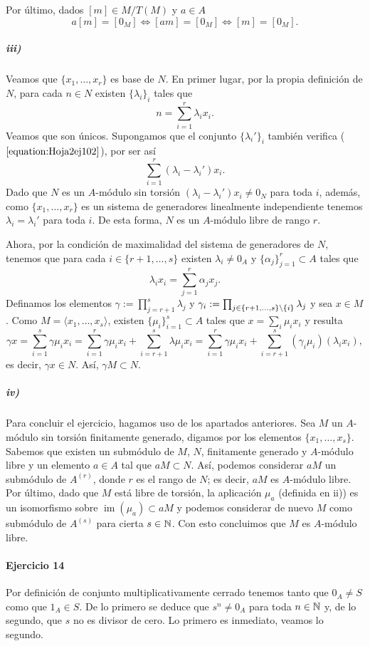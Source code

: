 \documentclass[../main.tex]{subfiles}
\begin{document}
Por último, dados $[m]\in M/T(M)$ y $a\in A$
$$a[m]=[0_M]\Longleftrightarrow [am]=[0_M]\Longleftrightarrow [m]=[0_M].$$

\subparagraph{iii)} Veamos que $\{x_1,\dots,x_r\}$ es base de $N$. En primer lugar, por la propia definición de $N$, para cada $n\in N$ existen $\{\lambda_i\}_i$ tales que
\begin{equation}\label{equation:Hoja2ej102}
    n=\sum_{i=1}^r\lambda_ix_i.
\end{equation}
Veamos que son únicos. Supongamos que el conjunto $\{\lambda_i'\}_i$ también verifica ($\ref{equation:Hoja2ej102}$), por ser así
$$\sum_{i=1}^r(\lambda_i-\lambda_i')x_i.$$
Dado que $N$ es un $A$-módulo sin torsión $(\lambda_i-\lambda_i')x_i\neq 0_N$ para toda $i$, además, como $\{x_1,\dots,x_r\}$ es un sistema de generadores linealmente independiente tenemos $\lambda_i=\lambda_i'$ para toda $i$.
De esta forma, $N$ es un $A$-módulo libre de rango $r$.

Ahora, por la condición de maximalidad del sistema de generadores de $N$, tenemos que para cada $i\in\{r+1,\dots,s\}$ existen $\lambda_i\neq 0_A$ y $\{\alpha_j\}_{j=1}^r\subset A$ tales que
$$\lambda_ix_i=\sum_{j=1}^r\alpha_jx_j.$$
Definamos los elementos $\gamma:=\prod_{j=r+1}^s\lambda_j$ y $\gamma_i:=\prod_{j\in\{r+1,\dots,s\}\setminus\{i\}}\lambda_j$ y sea $x\in M$. Como $M=\langle x_1,\dots, x_s\rangle$, existen $\{\mu_i\}_{i=1}^s\subset A$ tales que $x=\sum_i\mu_ix_i$ y resulta
$$\gamma x=\sum_{i=1}^s\gamma\mu_ix_i=\sum_{i=1}^r\gamma\mu_ix_i+\sum_{i=r+1}^s\lambda\mu_ix_i=\sum_{i=1}^r\gamma\mu_ix_i+\sum_{i=r+1}^s(\gamma_i\mu_i)(\lambda_ix_i),$$
es decir, $\gamma x\in N$. Así, $\gamma M\subset N$.

\subparagraph{iv)} Para concluir el ejercicio, hagamos uso de los apartados anteriores. Sea $M$ un $A$-módulo sin torsión finitamente generado, digamos por los elementos $\{x_1,\dots,x_s\}$. Sabemos que existen un submódulo de $M$, $N$, finitamente generado y $A$-módulo libre y un elemento $a\in A$ tal que $aM\subset N$. Así, podemos considerar $aM$ un submódulo de $A^{(r)}$, donde $r$ es el rango de $N$; es decir, $aM$ es $A$-módulo libre. Por último, dado que $M$ está libre de torsión, la aplicación $\mu_a$ (definida en ii)) es un isomorfismo sobre $\operatorname{im}(\mu_a)\subset aM$ y podemos considerar de nuevo $M$ como submódulo de $A^{(s)}$ para cierta $s\in\mathbb{N}$. Con esto concluimos que $M$ es $A$-módulo libre.

\paragraph{Ejercicio 14} Por definición de conjunto multiplicativamente cerrado tenemos tanto que $0_A\neq S$ como que $1_A\in S$. De lo primero se deduce que $s^n\neq 0_A$ para toda $n\in\mathbb{N}$ y, de lo segundo, que $s$ no es divisor de cero. Lo primero es inmediato, veamos lo segundo.
\end{document}
